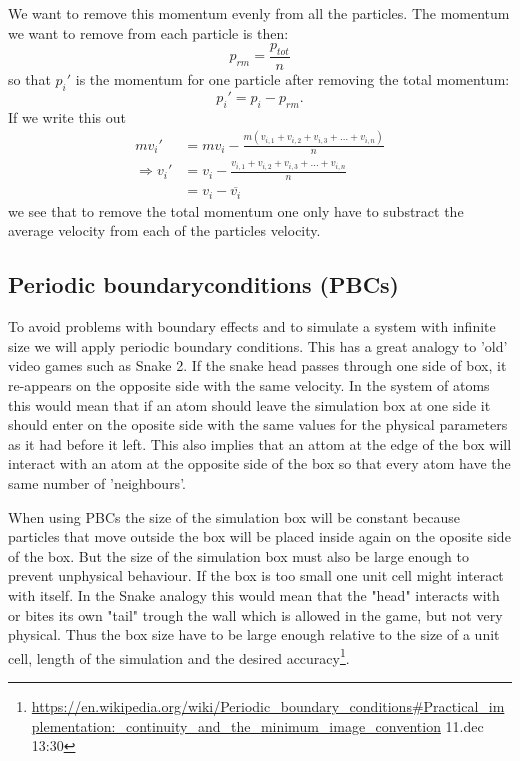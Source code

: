 \documentclass[11pt,a4wide]{article}
\begin{document}
We want to remove this momentum evenly from all the particles. The momentum we want to remove from each particle is then:
\[
p_{rm} = \frac{p_{tot}}{n}
\]
so that $p_i'$ is the momentum for one particle after removing the total momentum:
\[
p_i' = p_i - p_{rm}.
\]
If we write this out
\begin{align*}
mv_i' &= mv_i - \frac{m(v_{i,1} + v_{i,2} + v_{i,3} + \dots + v_{i,n})}{n} \\
\Rightarrow v_i' &= v_i - \frac{v_{i,1} + v_{i,2} + v_{i,3} + \dots + v_{i,n}}{n} \\
&= v_i - \overline{v_i}
\end{align*}
we see that to remove the total momentum one only have to substract the average velocity from each of the particles velocity. 

\subsection{Periodic boundaryconditions (PBCs)} \label{sec: PBCs}
To avoid problems with boundary effects and to simulate a system with infinite size we will apply periodic boundary conditions. This has a great analogy to 'old' video games such as Snake 2. If the snake head passes through one side of box, it re-appears on the opposite side with the same velocity. In the system of atoms this would mean that if an atom should leave the simulation box at one side it should enter on the oposite side with the same values for the physical parameters as it had before it left. This also implies that an attom at the edge of the box will interact with an atom at the opposite side of the box so that every atom have the same number of 'neighbours'. 

When using PBCs the size of the simulation box will be constant because particles that move outside the box will be placed inside again on the oposite side of the box. But the size of the simulation box must also be large enough to prevent unphysical behaviour. If the box is too small one unit cell might interact with itself. In the Snake analogy this would mean that the "head" interacts with or bites its own "tail" trough the wall which is allowed in the game, but not very physical. Thus the box size have to be large enough relative to the size of a unit cell, length of the simulation and the desired accuracy\footnote{\url{https://en.wikipedia.org/wiki/Periodic\_boundary\_conditions\#Practical\_implementation:\_continuity\_and\_the\_minimum\_image\_convention} 11.dec 13:30}.
\end{document}
